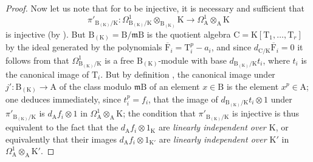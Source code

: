 \begin{proof}
Now let us note that for  to be injective, it is necessary and sufficient that
\[
  \pi'_{\mathrm{B}_{(\mathrm{K})}/\mathrm{K}}:\Omega^1_{\mathrm{B}_{(\mathrm{K})}/\mathrm{K}}\otimes_{\mathrm{B}_{(\mathrm{K})}}\mathrm{K}\to\Omega^1_\mathrm{A}\otimes_\mathrm{A}\mathrm{K}
\]
is injective (by ).
But $\mathrm{B}_{(\mathrm{K})}=\mathrm{B}/\mathfrak{m}\mathrm{B}$ is the quotient algebra $\mathrm{C}=\mathrm{K}[\mathrm{T}_1,\ldots,\mathrm{T}_r]$ by the ideal generated by the polynomials $\overline{\mathrm{F}}_i=\mathrm{T}_i^p-a_i$, and since $d_{\mathrm{C}/\mathrm{K}}\overline{\mathrm{F}}_i=0$ it follows from  that $\Omega^1_{\mathrm{B}_{(\mathrm{K})}/\mathrm{K}}$ is a free $\mathrm{B}_{(\mathrm{K})}$-module with base $d_{\mathrm{B}_{(\mathrm{K})}/\mathrm{K}}t_i$, where $t_i$ is the canonical image of $\mathrm{T}_i$.
But by definition , the canonical image under $j':\mathrm{B}_{(\mathrm{K})}\to\mathrm{A}$ of the class modulo $\mathfrak{m}\mathrm{B}$ of an element $x\in\mathrm{B}$ is the element $x^p\in\mathrm{A}$; one deduces immediately, since $t_i^p=f_i$, that the image of $d_{\mathrm{B}_{(\mathrm{K})}/\mathrm{K}}t_i\otimes 1$ under $\pi'_{\mathrm{B}_{(\mathrm{K})}/\mathrm{K}}$ is $d_\mathrm{A}f_i\otimes 1$ in $\Omega^1_\mathrm{A}\otimes_\mathrm{A}\mathrm{K}$; the condition that $\pi'_{\mathrm{B}_{(\mathrm{K})}/\mathrm{K}}$ is injective is thus equivalent to the fact that the $d_\mathrm{A}f_i\otimes 1_\mathrm{K}$ are \emph{linearly independent over $\mathrm{K}$}, or equivalently that their images $d_\mathrm{A}f_i\otimes 1_{\mathrm{K}'}$ are \emph{linearly independent over $\mathrm{K}'$} in $\Omega^1_\mathrm{A}\otimes_\mathrm{A}\mathrm{K}'$.


\end{proof}
